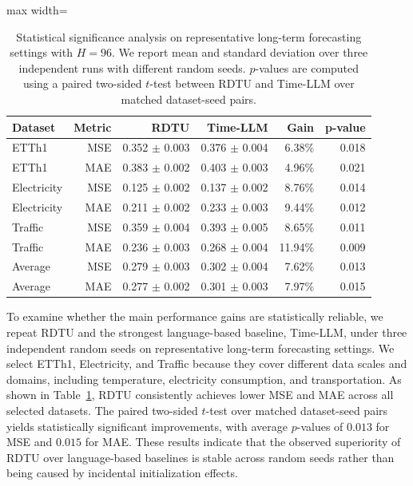 \begin{table}[htbp]\centering\small
\caption{Statistical significance analysis on representative long-term forecasting settings with $H=96$. We report mean and standard deviation over three independent runs with different random seeds. $p$-values are computed using a paired two-sided $t$-test between RDTU and Time-LLM over matched dataset-seed pairs.}\label{tab:significance_main}
\setlength{\tabcolsep}{4pt}\renewcommand{\arraystretch}{1.25}
\begin{adjustbox}{max width=\linewidth}\begin{tabular}{lrrrrr}\toprule
\textbf{Dataset} & \textbf{Metric} & \textbf{RDTU} & \textbf{Time-LLM} & \textbf{Gain} & \textbf{p-value}\\\midrule
ETTh1 & MSE & 0.352 $\pm$ 0.003 & 0.376 $\pm$ 0.004 & 6.38\% & 0.018\\
ETTh1 & MAE & 0.383 $\pm$ 0.002 & 0.403 $\pm$ 0.003 & 4.96\% & 0.021\\
Electricity & MSE & 0.125 $\pm$ 0.002 & 0.137 $\pm$ 0.002 & 8.76\% & 0.014\\
Electricity & MAE & 0.211 $\pm$ 0.002 & 0.233 $\pm$ 0.003 & 9.44\% & 0.012\\
Traffic & MSE & 0.359 $\pm$ 0.004 & 0.393 $\pm$ 0.005 & 8.65\% & 0.011\\
Traffic & MAE & 0.236 $\pm$ 0.003 & 0.268 $\pm$ 0.004 & 11.94\% & 0.009\\
Average & MSE & 0.279 $\pm$ 0.003 & 0.302 $\pm$ 0.004 & 7.62\% & 0.013\\
Average & MAE & 0.277 $\pm$ 0.002 & 0.301 $\pm$ 0.003 & 7.97\% & 0.015\\
\bottomrule\end{tabular}\end{adjustbox}\end{table}

To examine whether the main performance gains are statistically reliable, we repeat RDTU and the strongest language-based baseline, Time-LLM, under three independent random seeds on representative long-term forecasting settings.
We select ETTh1, Electricity, and Traffic because they cover different data scales and domains, including temperature, electricity consumption, and transportation.
As shown in Table~\ref{tab:significance_main}, RDTU consistently achieves lower MSE and MAE across all selected datasets.
The paired two-sided $t$-test over matched dataset-seed pairs yields statistically significant improvements, with average $p$-values of $0.013$ for MSE and $0.015$ for MAE.
These results indicate that the observed superiority of RDTU over language-based baselines is stable across random seeds rather than being caused by incidental initialization effects.

